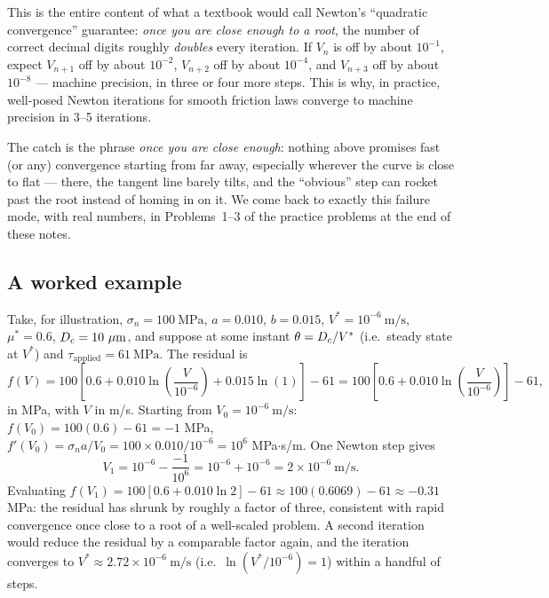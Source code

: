 This is the entire content of what a textbook would call Newton's ``quadratic convergence'' guarantee: \emph{once you are close enough to a root}, the number of correct decimal digits roughly \emph{doubles} every iteration. If $V_n$ is off by about $10^{-1}$, expect $V_{n+1}$ off by about $10^{-2}$, $V_{n+2}$ off by about $10^{-4}$, and $V_{n+3}$ off by about $10^{-8}$ --- machine precision, in three or four more steps. This is why, in practice, well-posed Newton iterations for smooth friction laws converge to machine precision in 3--5 iterations.

The catch is the phrase \emph{once you are close enough}: nothing above promises fast (or any) convergence starting from far away, especially wherever the curve is close to flat --- there, the tangent line barely tilts, and the ``obvious'' step can rocket past the root instead of homing in on it. We come back to exactly this failure mode, with real numbers, in Problems~1--3 of the practice problems at the end of these notes.

\subsection{A worked example}

Take, for illustration, $\sigma_n = 100\ \mathrm{MPa}$, $a = 0.010$, $b = 0.015$, $V^\ast = 10^{-6}\ \mathrm{m/s}$, $\mu^\ast = 0.6$, $D_c = 10\ \mu\mathrm{m}$, and suppose at some instant $\theta = D_c/V^\ast$ (i.e.\ steady state at $V^\ast$) and $\tau_{\mathrm{applied}} = 61\ \mathrm{MPa}$. The residual is
\begin{equation}
f(V) = 100\left[0.6 + 0.010\ln\!\left(\frac{V}{10^{-6}}\right) + 0.015 \ln(1)\right] - 61 = 100\left[0.6 + 0.010\ln\!\left(\frac{V}{10^{-6}}\right)\right] - 61,
\end{equation}
in MPa, with $V$ in m/s. Starting from $V_0 = 10^{-6}\ \mathrm{m/s}$: $f(V_0) = 100(0.6) - 61 = -1$ MPa, $f'(V_0) = \sigma_n a / V_0 = 100 \times 0.010 / 10^{-6} = 10^6$ MPa$\cdot$s/m. One Newton step gives
\begin{equation}
V_1 = 10^{-6} - \frac{-1}{10^6} = 10^{-6} + 10^{-6} = 2\times 10^{-6}\ \mathrm{m/s}.
\end{equation}
Evaluating $f(V_1) = 100[0.6 + 0.010\ln 2] - 61 \approx 100(0.6069) - 61 \approx -0.31$ MPa: the residual has shrunk by roughly a factor of three, consistent with rapid convergence once close to a root of a well-scaled problem. A second iteration would reduce the residual by a comparable factor again, and the iteration converges to $V^\ast \approx 2.72\times 10^{-6}\ \mathrm{m/s}$ (i.e.\ $\ln(V^\ast/10^{-6}) = 1$) within a handful of steps.


